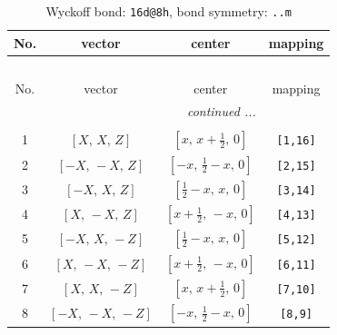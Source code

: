 \documentclass[fleqn,8pt]{jsarticle}
\begin{document}
\begin{longtable}{cccc}
\caption{Wyckoff bond: {\tt 16d@8h}, bond symmetry: {\tt ..m}}
 \\
 \hline \hline
No. & vector & center & mapping \\ \hline \endfirsthead

\multicolumn{3}{l}{\tablename\ \thetable{}} \\
 \hline \hline
No. & vector & center & mapping \\ \hline \endhead

 \hline \hline
\multicolumn{3}{r}{\footnotesize\it continued ...} \\ \endfoot

 \hline \hline
\multicolumn{3}{r}{} \\ \endlastfoot

1 & $\left[ X,\, X,\, Z \right]$ & $\left[ x,\, x + \frac{1}{2},\, 0 \right]$ & {\tt [1,16]} \\ \hline
2 & $\left[ - X,\, - X,\, Z \right]$ & $\left[ - x,\, \frac{1}{2} - x,\, 0 \right]$ & {\tt [2,15]} \\ \hline
3 & $\left[ - X,\, X,\, Z \right]$ & $\left[ \frac{1}{2} - x,\, x,\, 0 \right]$ & {\tt [3,14]} \\ \hline
4 & $\left[ X,\, - X,\, Z \right]$ & $\left[ x + \frac{1}{2},\, - x,\, 0 \right]$ & {\tt [4,13]} \\ \hline
5 & $\left[ - X,\, X,\, - Z \right]$ & $\left[ \frac{1}{2} - x,\, x,\, 0 \right]$ & {\tt [5,12]} \\ \hline
6 & $\left[ X,\, - X,\, - Z \right]$ & $\left[ x + \frac{1}{2},\, - x,\, 0 \right]$ & {\tt [6,11]} \\ \hline
7 & $\left[ X,\, X,\, - Z \right]$ & $\left[ x,\, x + \frac{1}{2},\, 0 \right]$ & {\tt [7,10]} \\ \hline
8 & $\left[ - X,\, - X,\, - Z \right]$ & $\left[ - x,\, \frac{1}{2} - x,\, 0 \right]$ & {\tt [8,9]} \\
\end{longtable}
\renewcommand{\arraystretch}{1.2}
\end{document}
